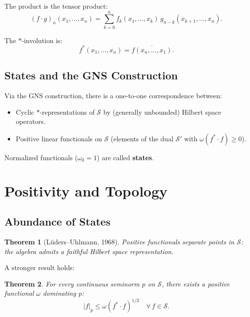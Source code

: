 \documentclass[11pt,a4paper]{article}
\newtheorem{theorem}{Theorem}[section]
\begin{document}
The product is the tensor product:
\begin{equation}
  (f \cdot g)_n(x_1,\ldots,x_n) = \sum_{k=0}^{n} f_k(x_1,\ldots,x_k)\,
  g_{n-k}(x_{k+1},\ldots,x_n).
\end{equation}

The $*$-involution is:
\begin{equation}
  f^*(x_1,\ldots,x_n) = \overline{f(x_n,\ldots,x_1)}.
\end{equation}

\subsection{States and the GNS Construction}

Via the GNS construction, there is a one-to-one correspondence between:
\begin{itemize}[nosep]
  \item Cyclic $*$-representations of $\mathcal{S}$ by (generally unbounded)
        Hilbert space operators.
  \item Positive linear functionals on $\mathcal{S}$ (elements of the dual
        $\mathcal{S}'$ with $\omega(f^* \cdot f) \geq 0$).
\end{itemize}
Normalized functionals ($\omega_0 = 1$) are called \textbf{states}.

\section{Positivity and Topology}

\subsection{Abundance of States}

\begin{theorem}[L\"uders--Uhlmann, 1968]
Positive functionals separate points in $\mathcal{S}$: the algebra
admits a faithful Hilbert space representation.
\end{theorem}

A stronger result holds:
\begin{theorem}
For every continuous seminorm $p$ on $\mathcal{S}$, there exists a
positive functional $\omega$ dominating $p$:
\[
  |f|_p \leq \omega(f^* \cdot f)^{1/2} \quad \forall\, f \in \mathcal{S}.
\]
\end{theorem}
\end{document}
